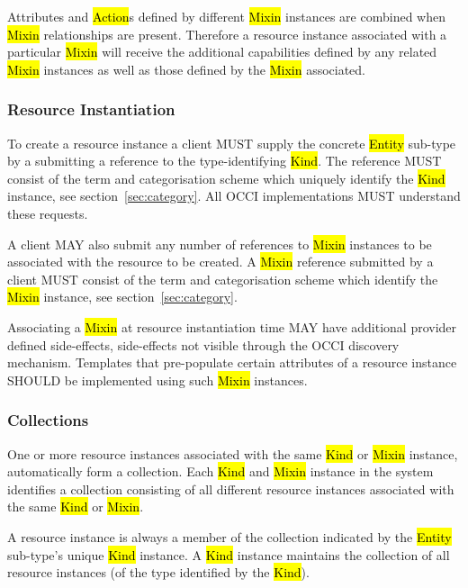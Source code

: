 \documentclass[10pt,a4paper]{article}
\begin{document}
Attributes and \hl{Action}s defined by different \hl{Mixin} instances
are combined when \hl{Mixin} relationships are present. Therefore a
resource instance associated with a particular \hl{Mixin} will receive
the additional capabilities defined by any related \hl{Mixin}
instances as well as those defined by the \hl{Mixin} associated.

\subsubsection{Resource Instantiation}
\label{sec:instantiation}
To create a resource instance a client MUST supply the concrete
\hl{Entity} sub-type by a submitting a reference to the
type-identifying \hl{Kind}.  The reference MUST consist of the term
and categorisation scheme which uniquely identify the \hl{Kind}
instance, see section~\ref{sec:category}.  All OCCI implementations
MUST understand these requests.

A client MAY also submit any number of references to \hl{Mixin}
instances to be associated with the resource to be created. A
\hl{Mixin} reference submitted by a client MUST consist of the term
and categorisation scheme which identify the \hl{Mixin} instance, see
section~\ref{sec:category}.

Associating a \hl{Mixin} at resource instantiation time MAY have
additional provider defined side-effects, side-effects not visible
through the OCCI discovery mechanism. Templates that pre-populate
certain attributes of a resource instance SHOULD be implemented using
such \hl{Mixin} instances.

\subsubsection{Collections}
\label{sec:collection}
One or more resource instances associated with the same \hl{Kind} or
\hl{Mixin} instance, automatically form a collection.  Each \hl{Kind}
and \hl{Mixin} instance in the system identifies a collection
consisting of all different resource instances associated with the same
\hl{Kind} or \hl{Mixin}.

A resource instance is always a member of the collection indicated by
the \hl{Entity} sub-type's unique \hl{Kind} instance. A \hl{Kind}
instance maintains the collection of all resource instances (of the
type identified by the \hl{Kind}).
\end{document}
